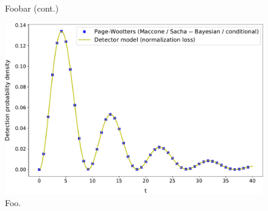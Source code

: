 {\begin{figure}[h!]
\begin{subfigure}{\textwidth}
    \end{subfigure}
    \caption{Foobar (cont.)}
  \end{figure}
}


\begin{figure}[h!]
  \centering
  \includegraphics[width=\textwidth]{img/3ldetect/conditionalProbFit.pdf}
  \caption{Foo.}
\end{figure}